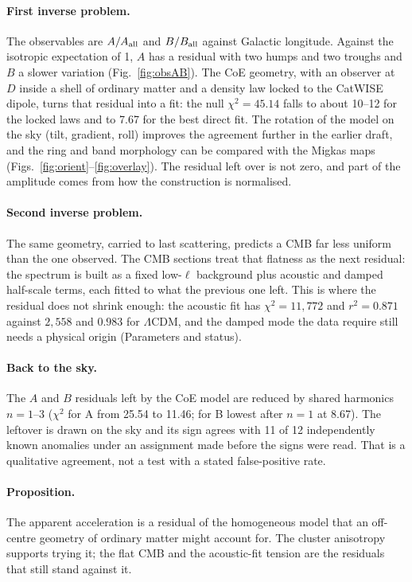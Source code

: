 \documentclass[10pt,twocolumn]{article}
\begin{document}
\paragraph{First inverse problem.} The observables are $A/A_{\rm all}$ and $B/B_{\rm all}$ against Galactic longitude. Against the isotropic expectation of 1, $A$ has a residual with two humps and two troughs and $B$ a slower variation (Fig.~\ref{fig:obsAB}). The CoE geometry, with an observer at $D$ inside a shell of ordinary matter and a density law locked to the CatWISE dipole, turns that residual into a fit: the null $\chi^2=45.14$ falls to about 10--12 for the locked laws and to 7.67 for the best direct fit. The rotation of the model on the sky (tilt, gradient, roll) improves the agreement further in the earlier draft, and the ring and band morphology can be compared with the Migkas maps (Figs.~\ref{fig:orient}--\ref{fig:overlay}). The residual left over is not zero, and part of the amplitude comes from how the construction is normalised.

\paragraph{Second inverse problem.} The same geometry, carried to last scattering, predicts a CMB far less uniform than the one observed. The CMB sections treat that flatness as the next residual: the spectrum is built as a fixed low-$\ell$ background plus acoustic and damped half-scale terms, each fitted to what the previous one left. This is where the residual does not shrink enough: the acoustic fit has $\chi^2=11{,}772$ and $r^2=0.871$ against $2{,}558$ and $0.983$ for $\Lambda$CDM, and the damped mode the data require still needs a physical origin (Parameters and status).

\paragraph{Back to the sky.} The $A$ and $B$ residuals left by the CoE model are reduced by shared harmonics $n=1$--3 ($\chi^2$ for A from 25.54 to 11.46; for B lowest after $n=1$ at 8.67). The leftover is drawn on the sky and its sign agrees with 11 of 12 independently known anomalies under an assignment made before the signs were read. That is a qualitative agreement, not a test with a stated false-positive rate.

\paragraph{Proposition.} The apparent acceleration is a residual of the homogeneous model that an off-centre geometry of ordinary matter might account for. The cluster anisotropy supports trying it; the flat CMB and the acoustic-fit tension are the residuals that still stand against it.
\end{document}

